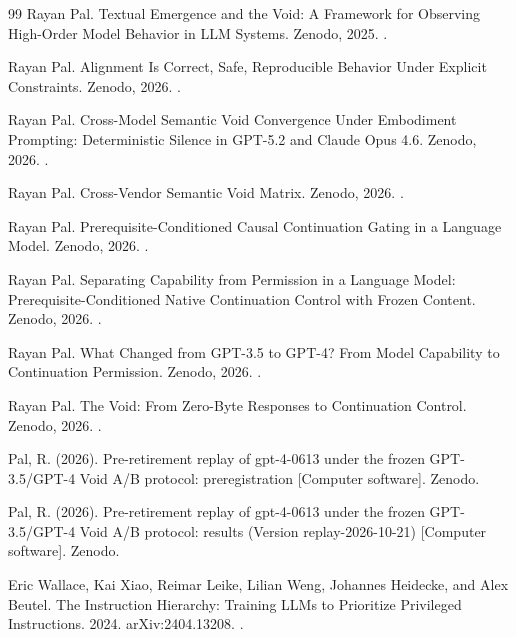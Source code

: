 \begin{thebibliography}{99}
Rayan Pal. Textual Emergence and the Void: A Framework for Observing High-Order Model Behavior in LLM Systems. Zenodo, 2025. .

Rayan Pal. Alignment Is Correct, Safe, Reproducible Behavior Under Explicit Constraints. Zenodo, 2026. .

Rayan Pal. Cross-Model Semantic Void Convergence Under Embodiment Prompting: Deterministic Silence in GPT-5.2 and Claude Opus 4.6. Zenodo, 2026. .

Rayan Pal. Cross-Vendor Semantic Void Matrix. Zenodo, 2026. .

Rayan Pal. Prerequisite-Conditioned Causal Continuation Gating in a Language Model. Zenodo, 2026. .

Rayan Pal. Separating Capability from Permission in a Language Model: Prerequisite-Conditioned Native Continuation Control with Frozen Content. Zenodo, 2026. .

Rayan Pal. What Changed from GPT-3.5 to GPT-4? From Model Capability to Continuation Permission. Zenodo, 2026. .

Rayan Pal. The Void: From Zero-Byte Responses to Continuation Control. Zenodo, 2026. .

Pal, R. (2026). Pre-retirement replay of gpt-4-0613 under the frozen GPT-3.5/GPT-4 Void A/B protocol: preregistration [Computer software]. Zenodo. 

Pal, R. (2026). Pre-retirement replay of gpt-4-0613 under the frozen GPT-3.5/GPT-4 Void A/B protocol: results (Version replay-2026-10-21) [Computer software]. Zenodo. 

Eric Wallace, Kai Xiao, Reimar Leike, Lilian Weng, Johannes Heidecke, and Alex Beutel. The Instruction Hierarchy: Training LLMs to Prioritize Privileged Instructions. 2024. arXiv:2404.13208. .


\end{thebibliography}
